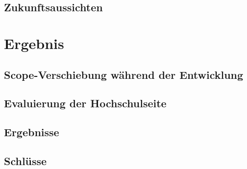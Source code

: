 	\section{Zukunftsaussichten}
	
\chapter{Ergebnis}
	\section{Scope-Verschiebung während der Entwicklung}
	\section{Evaluierung der Hochschulseite}
	\section{Ergebnisse}
	\section{Schlüsse}
